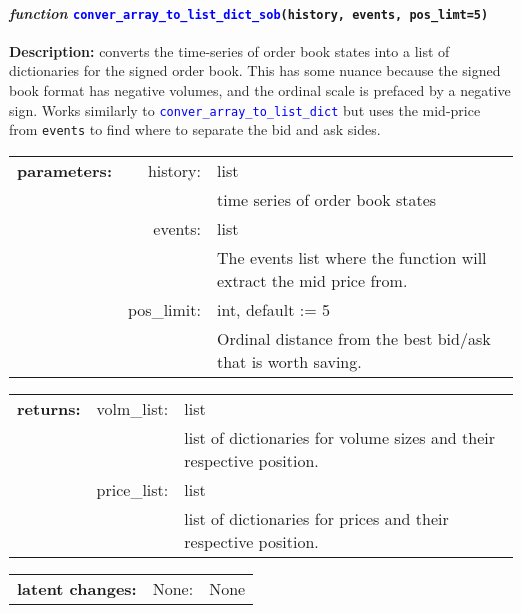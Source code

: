 \paragraph{\textit{function} \textcolor{blue}{\texttt{conver\_array\_to\_list\_dict\_sob}}\texttt{(history, events, pos\_limt=5)}}\hfill\break
\noindent \textbf{Description:} converts the time-series of order book states into a list of dictionaries for the signed order book. This has some nuance because the signed book format has negative volumes, and the ordinal scale is prefaced by a negative sign. Works similarly to \textcolor{blue}{\texttt{conver\_array\_to\_list\_dict}} but uses the mid-price from \texttt{events} to find where to separate the bid and ask sides. 

\begin{tabular}{r r l }
	\textbf{parameters:}	& history: & list\\
	&  & time series of order book states\\
	& events:& list \\
	&&The events list where the function will extract the mid price from.\\
	& pos\_limit:& int, default := 5\\
	&& Ordinal distance from the best bid/ask that is worth saving.	
\end{tabular}

\begin{tabular}{l c l}
	\textbf{returns:} & volm\_list: & list\\
	& & list of dictionaries for volume sizes and their respective position.\\
	& price\_list: & list\\
	&& list of dictionaries for prices and their respective position.
\end{tabular}

\begin{tabular}{l c l}
	\textbf{latent changes:} & None: & None\\
\end{tabular}

